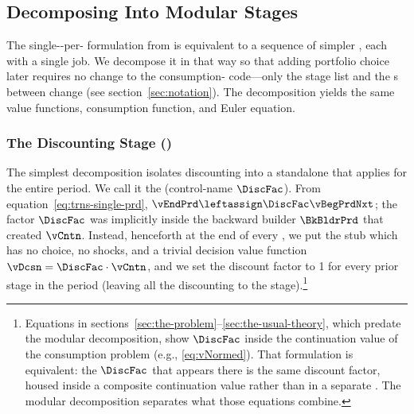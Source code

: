 \hypertarget{stages-within-a-period}{}
\subsection{Decomposing Into Modular Stages}\label{subsec:stageswithin}

The single-{\stg}-per-{\interval} formulation from  is equivalent to a sequence of simpler {\stgs}, each with a single job.  We decompose it in that way so that adding portfolio choice later requires no change to the consumption-{\stg} code---only the stage list and the {\Cnct}s between {\stgs} change (see section~\ref{sec:notation}).  The decomposition yields the same value functions, consumption function, and Euler equation.

\hypertarget{disc-stage}{}
\subsubsection{The Discounting Stage ()}\label{subsubsec:disc-stage}

The simplest decomposition isolates discounting into a standalone {\stg} that applies for the entire period.  We call it the  {\stg} (control-name $\DiscFac$).  From equation~\eqref{eq:trns-single-prd}, $\vEndPrd \leftassign \DiscFac \vBegPrdNxt$; the factor $\DiscFac$ was implicitly inside the backward builder $\BkBldrPrd$ that created $\vCntn$.  Instead, henceforth at the end of every {\interval},  we put the stub  {\stg} which has no choice, no shocks, and a trivial decision value function $\vDcsn = \DiscFac \cdot \vCntn$, and we set the discount factor to 1 for every prior stage in the period (leaving all the discounting to the  stage).\footnote{Equations in sections~\ref{sec:the-problem}--\ref{sec:the-usual-theory}, which predate the modular decomposition, show $\DiscFac$ inside the continuation value of the consumption problem (e.g., \eqref{eq:vNormed}).  That formulation is equivalent: the $\DiscFac$ that appears there is the same discount factor, housed inside a composite continuation value rather than in a separate {\stg}.  The modular decomposition separates what those equations combine.}

